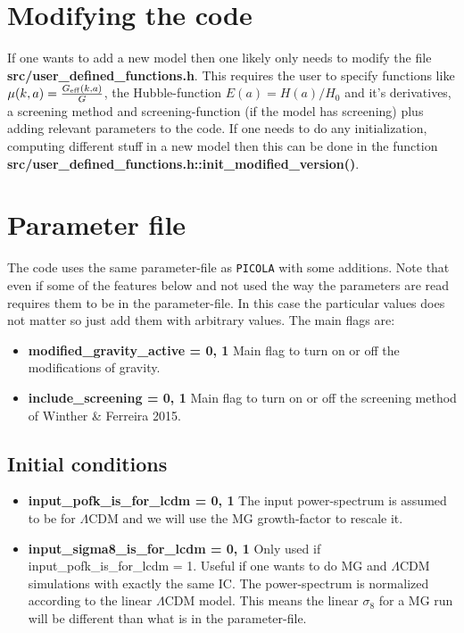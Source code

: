 \documentclass[usenatbib]{article}
\begin{document}
\section*{Modifying the code}

If one wants to add a new model then one likely only needs to modify the file \textbf{src/user\_defined\_functions.h}. This requires the user to specify functions like $\mu(k,a) = \frac{G_{\rm eff}(k,a)}{G}$, the Hubble-function $E(a) = H(a)/H_0$ and it's derivatives, a screening method and screening-function (if the model has screening) plus adding relevant parameters to the code.
\newline
\newline
If one needs to do any initialization, computing different stuff in a new model then this can be done in the function \textbf{src/user\_defined\_functions.h::init\_modified\_version()}.

\section*{Parameter file}
The code uses the same parameter-file as \texttt{PICOLA} with some additions. Note that even if some of the features below and not used the way the parameters are read requires them to be in the parameter-file. In this case the particular values does not matter so just add them with arbitrary values. The main flags are:
\begin{itemize}

\item \textbf{modified\_gravity\_active = 0, 1} Main flag to turn on or off the modifications of gravity.

\item \textbf{include\_screening = 0, 1} Main flag to turn on or off the screening method of Winther \& Ferreira 2015.

\end{itemize}

\subsection*{Initial conditions}

\begin{itemize}

\item \textbf{input\_pofk\_is\_for\_lcdm = 0, 1}  The input power-spectrum is assumed to be for $\Lambda$CDM and we will use the MG growth-factor to rescale it.

\item \textbf{input\_sigma8\_is\_for\_lcdm = 0, 1} Only used if input\_pofk\_is\_for\_lcdm = 1. Useful if one wants to do MG and $\Lambda$CDM simulations with exactly the same IC. The power-spectrum is normalized according to the linear $\Lambda$CDM model. This means the linear $\sigma_8$ for a MG run will be different than what is in the parameter-file.

\end{itemize}
\end{document}
